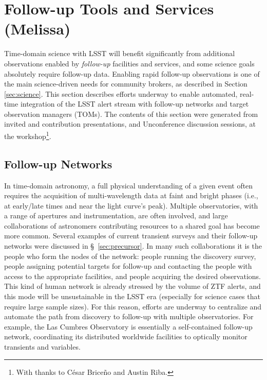 \section{Follow-up Tools and Services (Melissa)} \label{sec:followup}



Time-domain science with LSST will benefit significantly from additional observations enabled by \emph{follow-up} facilities and services, and some science goals absolutely require follow-up data.
Enabling rapid follow-up observations is one of the main science-driven needs for community brokers, as described in Section \ref{sec:science}.
This section describes efforts underway to enable automated, real-time integration of the LSST alert stream with follow-up networks and target observation managers (TOMs).
The contents of this section were generated from invited and contribution presentations, and Unconference discussion sessions, at the workshop\footnote{With thanks to César Briceño and Austin Riba.}.

\subsection{Follow-up Networks}\label{ssec:followup_networks}

In time-domain astronomy, a full physical understanding of a given event often requires the acquisition of multi-wavelength data at faint and bright phases (i.e., at early/late times and near the light curve's peak).
Multiple observatories, with a range of apertures and instrumentation, are often involved, and large collaborations of astronomers contributing resources to a shared goal has become more common.
Several examples of current transient surveys and their follow-up networks were discussed in \S~\ref{sec:precursor}.
In many such collaborations it is the people who form the nodes of the network: people running the discovery survey, people assigning potential targets for follow-up and contacting the people with access to the appropriate facilities, and people acquiring the desired observations.
This kind of human network is already stressed by the volume of ZTF alerts, and this mode will be unsustainable in the LSST era (especially for science cases that require large sample sizes).
For this reason, efforts are underway to centralize and automate the path from discovery to follow-up with multiple observatories.
For example, the Las Cumbres Observatory is essentially a self-contained follow-up network, coordinating its distributed worldwide facilities to optically monitor transients and variables.

